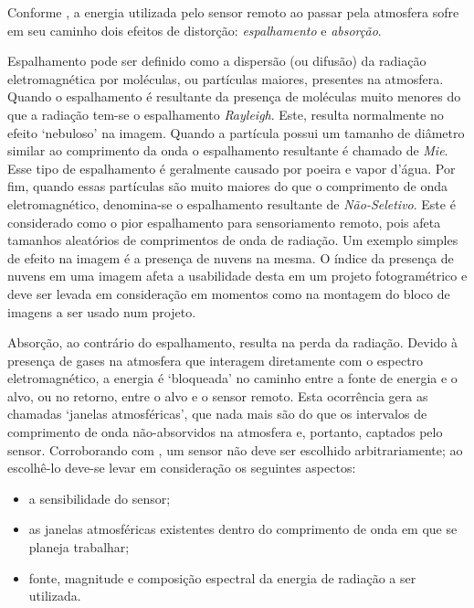 Conforme , a energia utilizada pelo sensor remoto ao passar pela atmosfera sofre em seu caminho dois efeitos de distorção: \textit{espalhamento} e \textit{absorção}.

Espalhamento pode ser definido como a dispersão (ou difusão) da radiação eletromagnética por moléculas, ou partículas maiores, presentes na atmosfera. Quando o espalhamento é resultante da presença de moléculas muito menores do que a radiação tem-se o espalhamento \textit{Rayleigh}. Este, resulta normalmente no efeito `nebuloso' na imagem. Quando a partícula possui um tamanho de diâmetro similar ao comprimento da onda o espalhamento resultante é chamado de \textit{Mie}. Esse tipo de espalhamento é geralmente causado por poeira e vapor d'água. Por fim, quando essas partículas são muito maiores do que o comprimento de onda eletromagnético, denomina-se o espalhamento resultante de \textit{Não-Seletivo}. Este é considerado como o pior espalhamento para sensoriamento remoto, pois afeta tamanhos aleatórios de comprimentos de onda de radiação. Um exemplo simples de efeito na imagem é a presença de nuvens na mesma. O índice da presença de nuvens em uma imagem afeta a usabilidade desta em um projeto fotogramétrico e deve ser levada em consideração em momentos como na montagem do bloco de imagens a ser usado num projeto.

Absorção, ao contrário do espalhamento, resulta na perda da radiação. Devido à presença de gases na atmosfera que interagem diretamente com o espectro eletromagnético, a energia é `bloqueada' no caminho entre a fonte de energia e o alvo, ou no retorno, entre o alvo e o sensor remoto. Esta ocorrência gera as chamadas `janelas atmosféricas', que nada mais são do que os intervalos de comprimento de onda não-absorvidos na atmosfera e, portanto, captados pelo sensor.
Corroborando com ,  um sensor não deve ser escolhido arbitrariamente; ao escolhê-lo deve-se levar em consideração os seguintes aspectos:
\begin{itemize}
\item a sensibilidade do sensor;
\item as janelas atmosféricas existentes dentro do comprimento de onda em que se planeja trabalhar;
\item fonte, magnitude e composição espectral da energia de radiação a ser utilizada.
\end{itemize}

